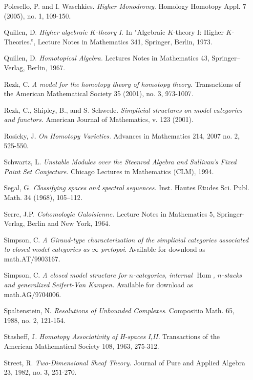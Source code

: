 \documentclass{report}[10pt, final]
\DeclareMathOperator{\Hom}{Hom} \DeclareMathOperator{\bP}{\beta P}
\theoremstyle{definition}
\begin{document}
\begin{thebibliography}{99}
 Polesello, P. and I. Waschkies. {\it Higher Monodromy.} Homology Homotopy Appl. 7 (2005), no. 1, 109-150.

 Quillen, D. {\it Higher algebraic $K$-theory I.} In "Algebraic $K$-theory I: Higher $K$-Theories.'', Lecture Notes in Mathematics 341, Springer, Berlin, 1973.

 Quillen, D. {\it Homotopical Algebra.} Lectures Notes in Mathematics 43, Springer--Verlag, Berlin, 1967. 

 Rezk, C. {\it A model for the homotopy theory of homotopy theory.} Transactions of the American Mathematical Society 35 (2001), no. 3, 973-1007.

 Rezk, C., Shipley, B., and S. Schwede. {\it Simplicial structures on model categories and functors.} American Journal of Mathematics, v. 123 (2001).

 Rosicky, J. {\it On Homotopy Varieties.} Advances in Mathematics
214, 2007 no. 2, 525-550.

 Schwartz, L. {\it Unstable Modules over the Steenrod Algebra and Sullivan's Fixed Point Set Conjecture.} Chicago Lectures in Mathematics (CLM), 1994.

 Segal, G. {\it Classifying spaces and spectral sequences.} 
Inst. Hautes Etudes Sci. Publ. Math. 34 (1968), 105--112. 

 Serre, J.P. {\it Cohomologie Galoisienne.}
Lecture Notes in Mathematics 5, Springer-Verlag, Berlin and New
York, 1964.

 Simpson, C. {\it A Giraud-type characterization of the
simplicial categories associated to closed model categories as
$\infty$-pretopoi}. Available for download as math.AT/9903167.

 Simpson, C. {\it A closed model structure for $n$-categories, internal
$\Hom$, $n$-stacks and generalized Seifert-Van Kampen.} Available for download as
math.AG/9704006.

 Spaltenstein, N. {\it Resolutions of Unbounded
Complexes}. Compositio Math. 65, 1988, no. 2, 121-154.

 Stasheff, J. {\it Homotopy Associativity of
H-spaces I,II.} Transactions of the American Mathematical Society
108, 1963, 275-312.

 Street, R. {\it Two-Dimensional Sheaf Theory.}
Journal of Pure and Applied Algebra 23, 1982, no. 3, 251-270.


\end{thebibliography}
\end{document}
